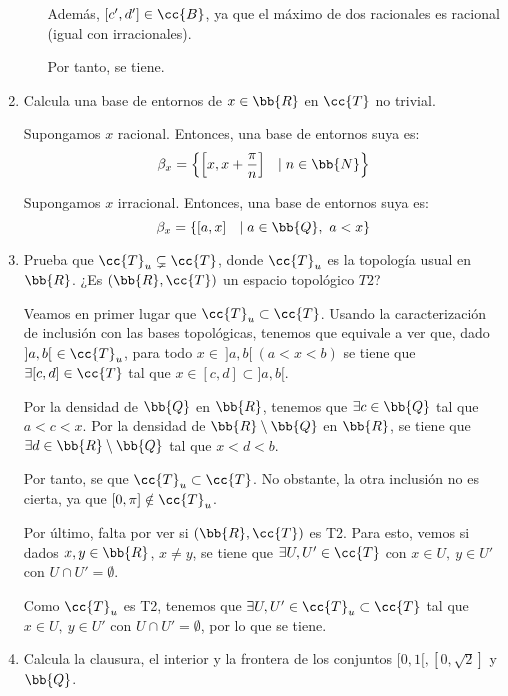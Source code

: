 \begin{ejercicio}
\begin{enumerate}[label=\alph*)]
\begin{enumerate}
            Además, $[c', d']\in \cc{B}$, ya que el máximo de dos racionales es racional (igual con irracionales).

            Por tanto, se tiene.
        \end{enumerate}

        \item Calcula una base de entornos de $x\in \bb{R}$ en $\cc{T}$ no trivial.

        Supongamos $x$ racional. Entonces, una base de entornos suya es:
        \begin{equation*}
            \beta_x=\left\{\left[x,x+\frac{\pi}{n}\right]~~ \mid n\in \bb{N}\right\}
        \end{equation*}

        Supongamos $x$ irracional. Entonces, una base de entornos suya es:
        \begin{equation*}
            \beta_x=\left\{\left[a,x\right]~~ \mid a\in \bb{Q},~a<x\right\}
        \end{equation*}

        \item Prueba que $\cc{T}_u\subsetneq \cc{T}$, donde $\cc{T}_u$ es la topología usual en $\bb{R}$. ¿Es $(\bb{R},\cc{T})$ un espacio topológico $T2$?


        Veamos en primer lugar que $\cc{T}_u\subset \cc{T}$. Usando la caracterización de inclusión con las bases topológicas, tenemos que equivale a ver que, dado $]a,b[~\in \cc{T}_u$, para todo $x\in~ ]a,b[~ (a<x<b)$ se tiene que $\exists [c,d]\in \cc{T}$ tal que $x\in [c,d]\subset ]a,b[$.

        Por la densidad de $\bb{Q}$ en $\bb{R}$, tenemos que $\exists c\in \bb{Q}$ tal que $a<c<x$. Por la densidad de $\bb{R}\setminus\bb{Q}$ en $\bb{R}$, se tiene que $\exists d\in \bb{R}\setminus\bb{Q}$ tal que $x<d<b$.
        
        Por tanto, se que $\cc{T}_u\subset \cc{T}$. No obstante, la otra inclusión no es cierta, ya que $[0,\pi]\notin \cc{T}_u$.


        Por último, falta por ver si $(\bb{R},\cc{T})$ es T2. Para esto, vemos si dados $x,y\in \bb{R}$, $x\neq y$, se tiene que $\exists U,U'\in \cc{T}$ con $x\in U,~ y\in U'$ con $U\cap U'=\emptyset$.

        Como $\cc{T}_u$ es T2, tenemos que $\exists U,U'\in \cc{T}_u\subset \cc{T}$ tal que $x\in U,~ y\in U'$ con $U\cap U'=\emptyset$, por lo que se tiene.
        

        \item Calcula la clausura, el interior y la frontera de los conjuntos $[0,1[, [0,\sqrt{2}]$ y $\bb{Q}$.


\end{enumerate}
\end{ejercicio}
